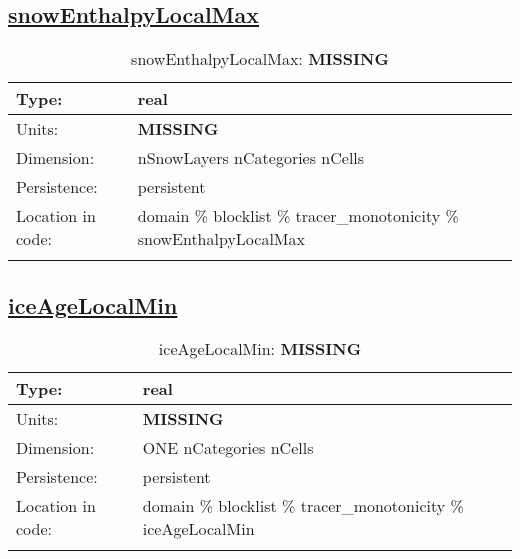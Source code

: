 \subsection[snowEnthalpyLocalMax]{\hyperref[sec:var_tab_tracer_monotonicity]{snowEnthalpyLocalMax}}
\label{subsec:var_sec_tracer_monotonicity_snowEnthalpyLocalMax}
\begin{center}
\begin{longtable}{| p{2.0in} | p{4.0in} |}
        \hline 
        Type: & real \\
        \hline 
        Units: & {\bf \color{red} MISSING} \\
        \hline 
        Dimension: & nSnowLayers nCategories nCells \\
        \hline 
        Persistence: & persistent \\
        \hline 
         Location in code: & domain \% blocklist \% tracer\_monotonicity \% snowEnthalpyLocalMax \\
         \hline 
    \caption{snowEnthalpyLocalMax: {\bf \color{red} MISSING}}
\end{longtable}
\end{center}
\subsection[iceAgeLocalMin]{\hyperref[sec:var_tab_tracer_monotonicity]{iceAgeLocalMin}}
\label{subsec:var_sec_tracer_monotonicity_iceAgeLocalMin}
\begin{center}
\begin{longtable}{| p{2.0in} | p{4.0in} |}
        \hline 
        Type: & real \\
        \hline 
        Units: & {\bf \color{red} MISSING} \\
        \hline 
        Dimension: & ONE nCategories nCells \\
        \hline 
        Persistence: & persistent \\
        \hline 
         Location in code: & domain \% blocklist \% tracer\_monotonicity \% iceAgeLocalMin \\
         \hline 
    \caption{iceAgeLocalMin: {\bf \color{red} MISSING}}
\end{longtable}
\end{center}

